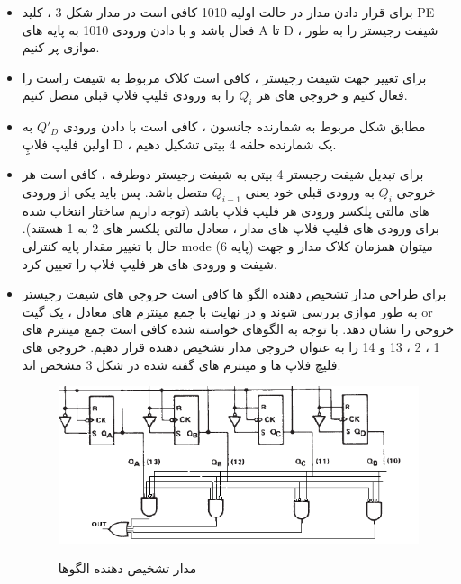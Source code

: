 \documentclass[twoside]{article}
\begin{document}
	\begin{itemize}
		\item		
		برای قرار دادن مدار در حالت اولیه 1010 کافی است در مدار شکل 3 ، کلید PE فعال باشد و با دادن ورودی 1010 به پایه های A تا D ، شیفت رجیستر را به طور موازی پر کنیم.
		
		\item
		برای تغییر جهت شیفت رجیستر ، کافی است کلاک مربوط به شیفت راست را فعال کنیم و خروجی های هر $Q_{i}$ را به ورودی فلیپ فلاپ قبلی متصل کنیم.
		\item
		مطابق شکل مربوط به شمارنده جانسون ، کافی است با دادن ورودی
		 $ Q'_{D} $
		 به اولین فلیپ فلاپِ D ، یک شمارنده حلقه 4 بیتی تشکیل دهیم.
		 
		 \item
		 برای تبدیل شیفت رجیستر 4 بیتی به شیفت رجیستر دوطرفه ، کافی است هر خروجی
		 $ Q_{i} $
		 به ورودی قبلی خود یعنی $Q_{i-1}$ متصل باشد. پس باید یکی از ورودی های مالتی پلکسر ورودی هر فلیپ فلاپ باشد (توجه داریم ساختار انتخاب شده برای ورودی های فلیپ فلاپ های مدار ، معادل مالتی پلکسر های 2 به 1 هستند). حال با تغییر مقدار پایه کنترلی mode (پایه 6) میتوان همزمان کلاک مدار و جهت شیفت و ورودی های هر فلیپ فلاپ را تعیین کرد.
		 \item
		 برای طراحی مدار تشخیص دهنده الگو ها کافی است خروجی های شیفت رجیستر به طور موازی بررسی شوند و در نهایت با جمع مینترم های معادل ، یک گیت or خروجی را نشان دهد. با توجه به الگوهای خواسته شده کافی است جمع مینترم های 1 ، 2 ، 13 و 14 را به عنوان خروجی مدار تشخیص دهنده قرار دهیم. خروجی های فلیچ فلاپ ها و مینترم های گفته شده در شکل 3 مشخص اند.
		 
		 \begin{figure}[h!]
		 	\begin{center}
		 		\includegraphics[scale=0.6]{pattern_finder}‎
		 		\caption{مدار تشخیص دهنده الگوها}
		 	\end{center}
		 \end{figure}
	 

\end{itemize}
\end{document}
